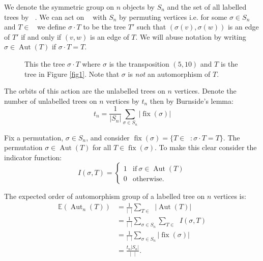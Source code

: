 \documentclass[oneside]{book} %
\theoremstyle{definition}
\numberwithin{equation}{section}
\DeclareMathOperator{\Aut}{Aut} %
\DeclareMathOperator{\lT}{\tilde{\mathcal{T}}_n}
\DeclareMathOperator{\fix}{fix}
\begin{document}
We denote the symmetric group on $n$ objects by $S_n$ and the set of all labelled trees by $\lT$.  We can act on $\lT$ with $S_n$ by permuting vertices i.e. for some $\sigma \in S_n$ and $T \in \lT$ we define $\sigma \cdot T$ to be the tree $T'$ such that $(\sigma(v),\sigma(w))$ is an edge of $T'$ if and only if $(v,w)$ is an edge of $T$.  We will abuse notation by writing $\sigma \in \Aut(T)$ if $\sigma \cdot T = T$.  

\begin{figure}[ht]
\centering
{}
\caption{This the tree $\sigma \cdot T$ where $\sigma$ is the transposition $(5,10)$ and $T$ is the tree in Figure \ref{fig1}.  Note that $\sigma$ is \emph{not} an automorphism of $T$.  }\label{fig15}
\end{figure}  
The orbits of this action are the unlabelled trees on $n$ vertices.  Denote the number of unlabelled trees on $n$ vertices by $t_n$ then by Burnside's lemma:
\begin{equation}\label{eqn:burnside}
   t_n = \frac{1}{\lvert S_n \rvert}\sum_{\sigma \in S_n} \lvert \fix(\sigma) \rvert
\end{equation}

Fix a permutation, $\sigma \in S_n$, and consider $\fix(\sigma) = \{T \in \lT : \sigma \cdot T  = T\}$. The permutation $\sigma \in \Aut(T)$ for all $T \in \fix(\sigma)$.  To make this clear consider the indicator function:
\[
 I(\sigma,T) = \begin{cases}
                1 & \text{if}\ \sigma \in \Aut(T) \\
                0 & \text{otherwise.}
               \end{cases}
\]

The expected order of automorphism group of a labelled tree on $n$ vertices is:
\begin{align}
\mathbb{E}(\Aut_n(T)) &= \frac{1}{\lvert \lT \rvert}\sum_{T \in \lT} \lvert \Aut(T) \rvert \\
&= \frac{1}{\lvert \lT \rvert}\sum_{\sigma \in S_n}\sum_{T \in \lT} I(\sigma,T) \\
&=  \frac{1}{\lvert \lT \rvert}\sum_{\sigma \in S_n}\lvert \fix(\sigma) \rvert \\
&= \frac{t_n\lvert S_n\rvert}{\lvert \lT \rvert}.
\end{align}
\end{document}
